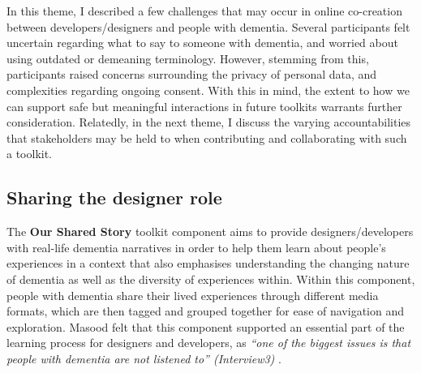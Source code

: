 In this theme, I described a few challenges that may occur in online co-creation between developers/designers and people with dementia. Several participants felt uncertain regarding what to say to someone with dementia, and worried about using outdated or demeaning terminology. However, stemming from this, participants raised concerns surrounding the privacy of personal data, and complexities regarding ongoing consent. With this in mind, the extent to how we can support safe but meaningful interactions in future toolkits warrants further consideration. Relatedly, in the next theme, I discuss the varying accountabilities that stakeholders may be held to when contributing and collaborating with such a toolkit.

\subsection{Sharing the designer role}
The \textbf{Our Shared Story} toolkit component aims to provide designers/developers with real-life dementia narratives in order to help them learn about people’s experiences in a context that also emphasises understanding the changing nature of dementia as well as the diversity of experiences within. Within this component, people with dementia share their lived experiences through different media formats, which are then tagged and grouped together for ease of navigation and exploration. Masood felt that this component supported an essential part of the learning process for designers and developers, as \textit{``one of the biggest issues is that people with dementia are not listened to'' (Interview3)} . 

